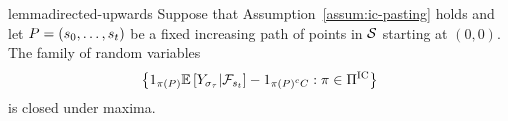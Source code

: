 \begin{restatable}{lemma}{directed-upwards}
    \label{lem:directed-upwards}
    Suppose that Assumption~\ref{assum:ic-pasting} holds
    and let 
    \(
        P
        =
        \left(
            s_{0},
            \ldots,
            s_{t}
        \right)
    \)
    be a fixed increasing path of points in $\mathcal{S}$ starting at $(0,0)$.
    The family of random variables 
    \begin{align*}
        \left\{
            1_{
                \pi\left(P\right)
            }
            \mathbb{E}\left[
                Y_{
                    \sigma_{\tau}
                }
                | \mathcal{F}_{s_{t}}
            \right]
            -
            1_{
                \pi\left(P\right)^c
                C
            }
            :
            \pi\in\Pi^{\text{IC}}
        \right\}
    \end{align*}  
    is closed under maxima. 
\end{restatable}  
